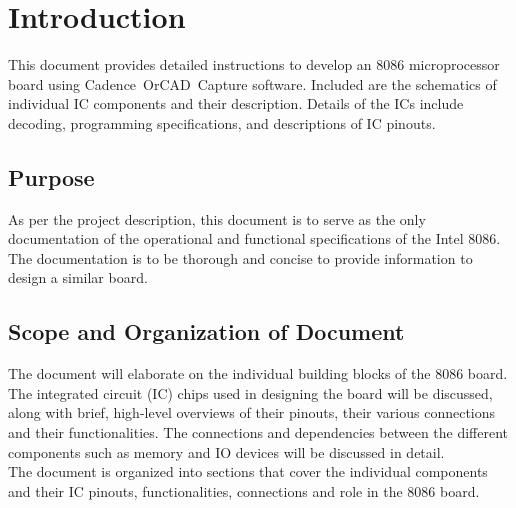 \newpage
\section{Introduction}
This document provides detailed instructions to develop an 8086 microprocessor board using Cadence\textregistered \ OrCAD\textregistered \ Capture software. Included are the schematics of individual IC components and their description. Details of the ICs include decoding, programming specifications, and descriptions of IC pinouts.

    \subsection{Purpose}
    As per the project description, this document is to serve as the only documentation of the operational and functional specifications of the Intel 8086. The documentation is to be thorough and concise to provide information to design a similar board.

    \subsection{Scope and Organization of Document}
    The document will elaborate on the individual building blocks of the 8086 board. The integrated circuit (IC) chips used in designing the board will be discussed, along with brief, high-level overviews of their pinouts, their various connections and their functionalities. The connections and dependencies between the different components such as memory and IO devices will be discussed in detail.\\

    The document is organized into sections that cover the individual components and their IC pinouts, functionalities, connections and role in the 8086 board.
